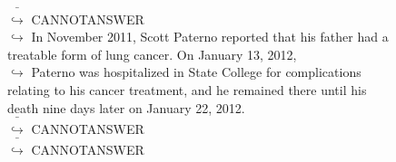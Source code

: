 \documentclass[11pt,a4paper, onecolumn]{article}
\begin{document}
\begin{figure}[t] \small \begin{tcolorbox}[boxsep=0pt,left=5pt,right=0pt,top=2pt,colback = yellow!5] \begin{dialogue}
 \small 
\colorbox{pink!25}{ $\bar{\hookrightarrow}$}
{ CANNOTANSWER }
\\
\colorbox{pink!25}{$\hookrightarrow$}
{ In November 2011, Scott Paterno reported that his father had a treatable form of lung cancer. On January 13, 2012, }
\\
\colorbox{pink!25}{$\hookrightarrow$}
{ Paterno was hospitalized in State College for complications relating to his cancer treatment, and he remained there until his death nine days later on January 22, 2012. }
\\
\colorbox{pink!25}{ $\bar{\hookrightarrow}$}
{ CANNOTANSWER }
\\
\colorbox{pink!25}{ $\bar{\hookrightarrow}$}
{ CANNOTANSWER }
\\
 \end{dialogue}\end{tcolorbox}\end{figure}
\end{document}
